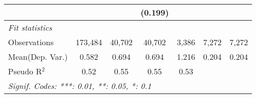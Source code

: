 \begin{tabular}{lcccccc}
                           &              &         & (0.199)       &              &       &   \\   
   \midrule
   \emph{Fit statistics}\\
   Observations            & 173,484      & 40,702  & 40,702        & 3,386        & 7,272 & 7,272\\  
Mean(Dep. Var.) & 0.582 & 0.694 & 0.694 & 1.216 & 0.204 & 0.204 \\
   Pseudo R$^2$            & 0.52         & 0.55    & 0.55          & 0.53         &       & \\  
   \midrule \midrule
   \multicolumn{7}{l}{\emph{Signif. Codes: ***: 0.01, **: 0.05, *: 0.1}}\\
\end{tabular}
\par\endgroup
